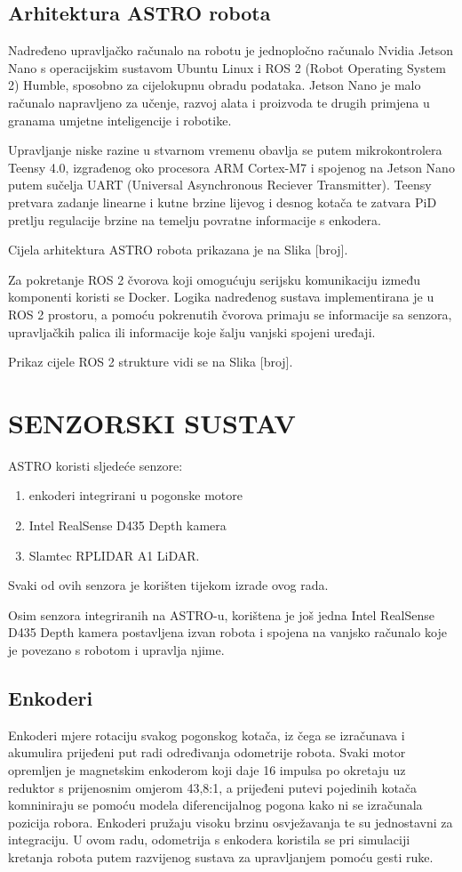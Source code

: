 \documentclass[12pt,a4paper,oneside]{report}
\begin{document}
\section{Arhitektura ASTRO robota}
Nadređeno upravljačko računalo na robotu je jednopločno računalo Nvidia Jetson Nano s operacijskim 
sustavom Ubuntu Linux i ROS 2 (Robot Operating System 2) Humble, sposobno za cijelokupnu obradu podataka.
Jetson Nano je malo računalo napravljeno za učenje, razvoj alata i proizvoda te drugih primjena u granama 
umjetne inteligencije i robotike. 

Upravljanje niske razine u stvarnom vremenu obavlja se putem mikrokontrolera Teensy 4.0, izgrađenog oko procesora 
ARM Cortex-M7 i spojenog na Jetson Nano putem sučelja UART (Universal Asynchronous Reciever Transmitter). 
Teensy pretvara zadanje linearne i kutne brzine lijevog i desnog kotača te zatvara PiD pretlju regulacije 
brzine na temelju povratne informacije s enkodera.

Cijela arhitektura ASTRO robota prikazana je na Slika [broj].

Za pokretanje ROS 2 čvorova koji omogućuju serijsku komunikaciju između 
komponenti koristi se Docker. Logika nadređenog sustava implementirana je u ROS 2 prostoru, 
a pomoću pokrenutih čvorova primaju se informacije sa senzora, upravljačkih palica ili informacije 
koje šalju vanjski spojeni uređaji. 

Prikaz cijele ROS 2 strukture vidi se na Slika [broj].

\chapter{SENZORSKI SUSTAV}
ASTRO koristi sljedeće senzore:
\begin{enumerate}
  \item enkoderi integrirani u pogonske motore
  \item Intel RealSense D435 Depth kamera
  \item Slamtec RPLIDAR A1 LiDAR.
\end{enumerate}
Svaki od ovih senzora je korišten tijekom izrade ovog rada. 

Osim senzora integriranih na ASTRO-u, korištena je još jedna Intel RealSense D435 Depth kamera postavljena 
izvan robota i spojena na vanjsko računalo koje je povezano s robotom i upravlja njime.

\section{Enkoderi}
Enkoderi mjere rotaciju svakog pogonskog kotača, iz čega se izračunava i akumulira prijeđeni put radi 
određivanja odometrije robota. Svaki motor opremljen je magnetskim enkoderom koji daje 16 impulsa po okretaju 
uz reduktor s prijenosnim omjerom 43,8:1, a prijeđeni putevi pojedinih kotača komniniraju se pomoću modela 
diferencijalnog pogona kako ni se izračunala pozicija robora. Enkoderi pružaju visoku brzinu osvježavanja te su 
jednostavni za integraciju. U ovom radu, odometrija s enkodera koristila se pri simulaciji kretanja robota putem 
razvijenog sustava za upravljanjem pomoću gesti ruke.
\end{document}
